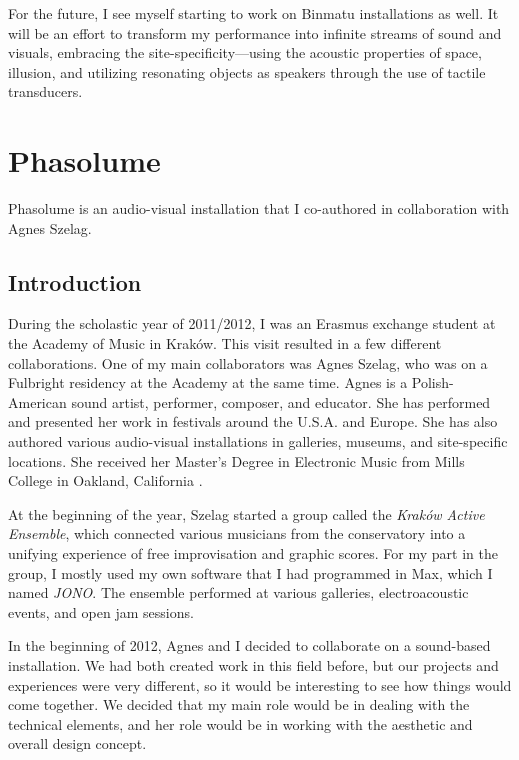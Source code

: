 \documentclass[12pt,a4paper,oneside]{report}
\begin{document}
For the future, I see myself starting to work on Binmatu installations as well. It will be an effort to transform my performance into infinite streams of sound and visuals, embracing the site-specificity---using the acoustic properties of space, illusion, and utilizing resonating objects as speakers through the use of tactile transducers.


\section{Phasolume} Phasolume is an audio-visual installation that I co-authored in collaboration with Agnes Szelag.

\subsection{Introduction} 

During the scholastic year of 2011/2012, I was an Erasmus exchange student at the Academy of Music in Kraków. This visit resulted in a few different collaborations. One of my main collaborators was Agnes Szelag, who was on a Fulbright residency at the Academy at the same time.  Agnes is a Polish-American sound artist, performer, composer, and educator. She has performed and presented her work in festivals around the U.S.A. and Europe. She has also authored various audio-visual installations in galleries, museums, and site-specific locations. She received her Master’s Degree in Electronic Music from Mills College in Oakland, California \cite{szelag}.

At the beginning of the year, Szelag started a group called the \emph{Kraków Active Ensemble}, which connected various musicians from the conservatory into a unifying experience of free improvisation and graphic scores. For my part in the group, I mostly used my own software that I had programmed in Max, which I named \emph{JONO}. The ensemble performed at various galleries, electroacoustic events, and open jam sessions.

In the beginning of 2012, Agnes and I decided to collaborate on a sound-based installation. We had both created work in this field before, but our projects and experiences were very different, so it would be interesting to see how things would come together.  We decided that my main role would be in dealing with the technical elements, and her role would be in working with the aesthetic and overall design concept.
\end{document}
